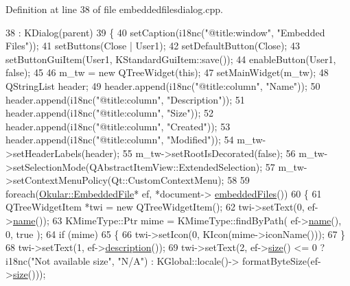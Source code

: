 Definition at line 38 of file embeddedfilesdialog.\+cpp.


\begin{DoxyCode}
38                                                                                         : KDialog(parent)
39 \{
40     setCaption(i18nc(\textcolor{stringliteral}{"@title:window"}, \textcolor{stringliteral}{"Embedded Files"}));
41     setButtons(Close | User1);
42     setDefaultButton(Close);
43     setButtonGuiItem(User1, KStandardGuiItem::save());
44     enableButton(User1, \textcolor{keyword}{false});
45 
46     m\_tw = \textcolor{keyword}{new} QTreeWidget(\textcolor{keyword}{this});
47     setMainWidget(m\_tw);
48     QStringList header;
49     header.append(i18nc(\textcolor{stringliteral}{"@title:column"}, \textcolor{stringliteral}{"Name"}));
50     header.append(i18nc(\textcolor{stringliteral}{"@title:column"}, \textcolor{stringliteral}{"Description"}));
51     header.append(i18nc(\textcolor{stringliteral}{"@title:column"}, \textcolor{stringliteral}{"Size"}));
52     header.append(i18nc(\textcolor{stringliteral}{"@title:column"}, \textcolor{stringliteral}{"Created"}));
53     header.append(i18nc(\textcolor{stringliteral}{"@title:column"}, \textcolor{stringliteral}{"Modified"}));
54     m\_tw->setHeaderLabels(header);
55     m\_tw->setRootIsDecorated(\textcolor{keyword}{false});
56     m\_tw->setSelectionMode(QAbstractItemView::ExtendedSelection);
57     m\_tw->setContextMenuPolicy(Qt::CustomContextMenu);
58 
59     \textcolor{keywordflow}{foreach}(\hyperlink{classOkular_1_1EmbeddedFile}{Okular::EmbeddedFile}* ef, *document->
      \hyperlink{classOkular_1_1Document_a0d0f25adc4dab338160d951a2fafd2d3}{embeddedFiles}())
60     \{
61         QTreeWidgetItem *twi = \textcolor{keyword}{new} QTreeWidgetItem();
62         twi->setText(0, ef->\hyperlink{classOkular_1_1EmbeddedFile_a70fcfea705979ce6a31b989fc92a8f2b}{name}());
63         KMimeType::Ptr mime = KMimeType::findByPath( ef->\hyperlink{classOkular_1_1EmbeddedFile_a70fcfea705979ce6a31b989fc92a8f2b}{name}(), 0, true );
64         \textcolor{keywordflow}{if} (mime)
65         \{
66             twi->setIcon(0, KIcon(mime->iconName()));
67         \}
68         twi->setText(1, ef->\hyperlink{classOkular_1_1EmbeddedFile_a91a6efdeb1423a4030ce438b2a58c9a0}{description}());
69         twi->setText(2, ef->\hyperlink{classOkular_1_1EmbeddedFile_a16654b3db51a4c46276516f7987c975d}{size}() <= 0 ? i18nc(\textcolor{stringliteral}{"Not available size"}, \textcolor{stringliteral}{"N/A"}) : KGlobal::locale()->
      formatByteSize(ef->\hyperlink{synctex__parser_8c_aa23c661441688350614bd6a350d2b6ff}{size}()));

\end{DoxyCode}
